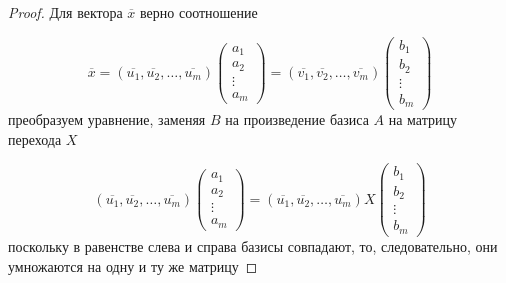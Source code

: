 \documentclass[]{article}
\theoremstyle{theorem}
\theoremstyle{definition}
\begin{document}
\begin{proof}
	Для вектора $\overline{x}$ верно соотношение

\begin{equation*}
	\overline{x}=
	(\overline{u_1},\overline{u_2},\ldots, \overline{u_m})	
	\begin{pmatrix}
		a_1
		\\
		a_2
		\\
		\vdots
		\\
		a_m
	\end{pmatrix}
	=
	(\overline{v_1},\overline{v_2},\ldots, \overline{v_m})	
	\begin{pmatrix}
		b_1
		\\
		b_2
		\\
		\vdots
		\\
		b_m
	\end{pmatrix}
\end{equation*}
преобразуем уравнение, заменяя $B$ на произведение базиса $A$ на матрицу перехода $X$

\begin{equation*}
	(\overline{u_1},\overline{u_2},\ldots, \overline{u_m})	
	\begin{pmatrix}
		a_1
		\\
		a_2
		\\
		\vdots
		\\
		a_m
	\end{pmatrix}
	=
	(\overline{u_1},\overline{u_2},\ldots, \overline{u_m})X
	\begin{pmatrix}
		b_1
		\\
		b_2
		\\
		\vdots
		\\
		b_m
	\end{pmatrix}
\end{equation*}
поскольку в равенстве слева и справа базисы совпадают, то, следовательно, они умножаются на одну и ту же матрицу


\end{proof}
\end{document}
